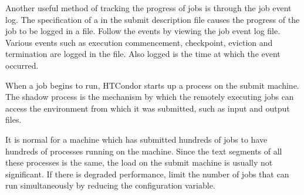 Another useful method of tracking the progress of jobs is through the
job event log.  The specification of a  in 
the submit description file causes the progress of the job 
to be logged in a file.  Follow the events by viewing the
job event log file.  
Various events such as execution commencement, checkpoint, eviction 
and termination are logged in the file.
Also logged is the time at which the event occurred.

When a job begins to run, HTCondor starts up a  process
on the submit machine.  The shadow process is the mechanism by which the
remotely executing jobs can access the environment from which it was
submitted, such as input and output files.  

It is normal for a machine which has submitted hundreds of jobs to have 
hundreds of  processes running on the machine.
Since the text segments of all these processes is the same,
the load on the submit machine is usually not significant.
If there is degraded performance, limit 
the number of jobs that can run simultaneously by reducing the 
 configuration variable.


